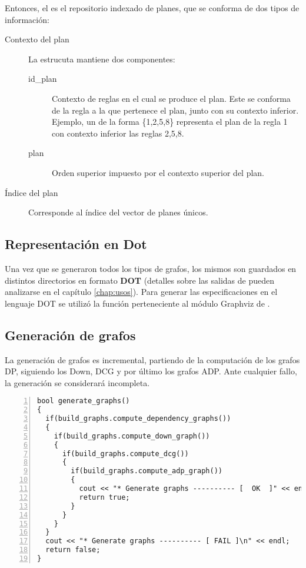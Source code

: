 Entonces, el  es el repositorio indexado de planes, que se conforma de dos tipos de información:
\begin{description}
\item [Contexto del plan] La estrucuta  mantiene dos componentes:
\begin{description}
\item [id\_plan] Contexto de reglas en el cual se produce el plan. Este se conforma de la regla a la que pertenece el plan, junto con su contexto inferior. Ejemplo, un  de la forma \{1,2,5,8\} representa el plan de la regla 1 con contexto inferior las reglas 2,5,8.
\item [plan] Orden superior impuesto por el contexto superior del plan.
\end{description}
\item [Índice del plan] Corresponde al índice del vector de planes únicos.
\end{description}

\subsection{Representación en Dot}

Una vez que se generaron todos los tipos de grafos, los mismos son guardados en distintos directorios en formato \textbf{DOT}\cite{dot} (detalles sobre las salidas de \maggen pueden analizarse en el capítulo \ref{chap:usos}). Para generar las especificaciones en el lenguaje DOT se utilizó la función  perteneciente al módulo Graphviz de \boost.

\subsection{Generación de grafos}

La generación de grafos es incremental, partiendo de la computación de los grafos DP, siguiendo los Down, DCG y por último los grafos ADP. Ante cualquier fallo, la generación se considerará incompleta.

\begin{lstlisting}[numbers=left, columns=fullflexible, linewidth=11.3cm]
bool generate_graphs()
{
  if(build_graphs.compute_dependency_graphs())
  {
    if(build_graphs.compute_down_graph())
    {
      if(build_graphs.compute_dcg())
      {
        if(build_graphs.compute_adp_graph())
        {
          cout << "* Generate graphs ---------- [  OK  ]" << endl;
          return true;
        }
      }
    }
  }
  cout << "* Generate graphs ---------- [ FAIL ]\n" << endl;
  return false;
}
\end{lstlisting}

